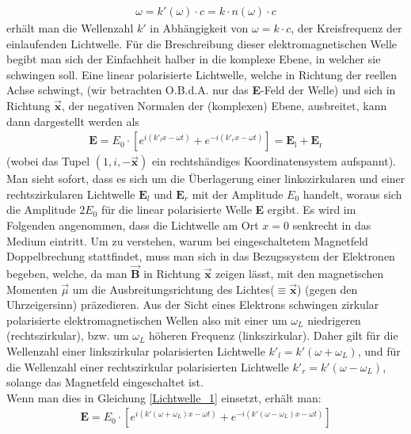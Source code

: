 \documentclass[12pt,a4paper]{article}
\begin{document}
\begin{align}
\omega = k'(\omega)\cdot c = k\cdot n(\omega)\cdot c
\label{Dispersionsrelation}
\end{align}
erhält man die Wellenzahl $k'$ in Abhängigkeit von $\omega = k\cdot c$, der Kreisfrequenz der einlaufenden Lichtwelle.
Für die Breschreibung dieser elektromagnetischen Welle begibt man sich der Einfachheit halber in die komplexe Ebene, in welcher sie schwingen soll. Eine linear polarisierte Lichtwelle, welche in Richtung der reellen Achse schwingt, (wir betrachten O.B.d.A. nur das \textbf{E}-Feld der Welle) und sich in Richtung $\vec{\textbf{x}}$, der negativen Normalen der (komplexen) Ebene, ausbreitet, kann dann dargestellt werden als
 \begin{align}
\textbf{E} = E_0\cdot[e^{i( k'_l x - \omega t)}+e^{-i( k'_r x - \omega t )}] = \textbf{E}_{\text{l}} + \textbf{E}_{\text{r}}
\label{Lichtwelle_1}
 \end{align}
(wobei das Tupel $(1,i,-\vec{\textbf{x}})$ ein rechtshändiges Koordinatensystem aufspannt).
Man sieht sofort, dass es sich um die Überlagerung einer linkszirkularen und einer rechtszirkularen Lichtwelle $\textbf{E}_l$ und $\textbf{E}_r$ mit der Amplitude $E_0$ handelt, woraus sich die Amplitude $2E_0$ für die linear polarisierte Welle \textbf{E} ergibt.\newpage \noindent
Es wird im Folgenden angenommen, dass die Lichtwelle am Ort $x=0$ senkrecht in das Medium eintritt.  Um zu verstehen, warum bei eingeschaltetem Magnetfeld Doppelbrechung stattfindet, muss man sich in das Bezugssystem der Elektronen begeben, welche, da man $\vec{\textbf{B}}$ in Richtung $\vec{\textbf{x}}$ zeigen lässt, mit den magnetischen Momenten $\vec{\mu}$ um die Ausbreitungsrichtung des Lichtes($ \equiv \vec{\textbf{x}}$) (gegen den Uhrzeigersinn) präzedieren. Aus der Sicht eines Elektrons schwingen zirkular polarisierte elektromagnetischen Wellen also mit einer um $\omega_L$ niedrigeren (rechtszirkular), bzw. um $\omega_L$ höheren Frequenz (linkszirkular). Daher gilt für die Wellenzahl einer linkszirkular polarisierten Lichtwelle $k'_l = k'(\omega + \omega_L)$, und für die Wellenzahl einer rechtszirkular polarisierten Lichtwelle $k'_r = k'(\omega - \omega_L)$, solange das Magnetfeld eingeschaltet ist.\\
Wenn man dies in Gleichung \ref{Lichtwelle_1} einsetzt, erhält man:
\begin{align}
\textbf{E} = E_0\cdot[e^{i(k'(\omega + \omega_L) x - \omega t)}+e^{-i(k'(\omega - \omega_L) x - \omega t)}]
\label{Lichtwelle_2}
\end{align}
\end{document}
